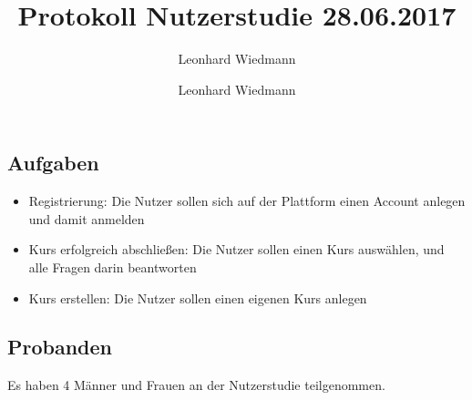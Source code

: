 \documentclass[colorback, accentcolor=tud1c, paper=a4]{tudexercise}
\title{Protokoll Nutzerstudie 28.06.2017}
\subtitle{Leonhard Wiedmann}
\author{Leonhard Wiedmann}
\begin{document}
\maketitle
\subsection*{Aufgaben}
\begin{itemize}
	\item Registrierung: Die Nutzer sollen sich auf der Plattform einen Account anlegen und damit anmelden
	\item Kurs erfolgreich abschließen: Die Nutzer sollen einen Kurs auswählen, und alle Fragen darin beantworten
  	\item Kurs erstellen: Die Nutzer sollen einen eigenen Kurs anlegen
\end{itemize}

\subsection*{Probanden}
Es haben 4 Männer und Frauen an der Nutzerstudie teilgenommen.
\end{document}
